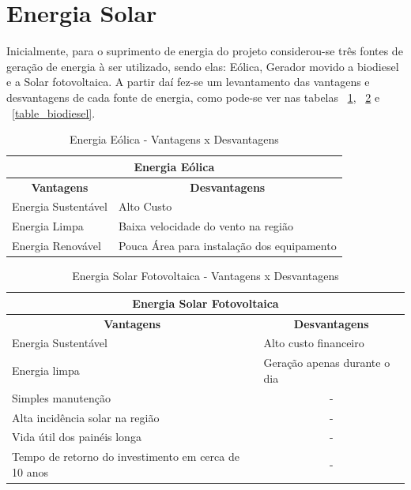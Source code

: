 \section{Energia Solar}
Inicialmente, para o suprimento de energia do projeto considerou-se três fontes de geração de energia à ser utilizado, sendo elas: Eólica, Gerador movido a biodiesel e a Solar fotovoltaica. A partir daí fez-se um levantamento das vantagens e desvantagens de cada fonte de energia, como pode-se ver nas tabelas ~\ref{table_eolica}, ~\ref{table_solar} e ~\ref{table_biodiesel}.

\begin{table}[h]
  \centering
  \caption{Energia Eólica - Vantagens x Desvantagens}
  \label{table_eolica}
  \begin{tabular}{|l|l|}
    \hline
    \multicolumn{2}{|c|}{\textbf{Energia Eólica}}                                         \\ \hline
    \multicolumn{1}{|c|}{\textbf{Vantagens}} & \multicolumn{1}{c|}{\textbf{Desvantagens}} \\ \hline
    Energia Sustentável                      & Alto Custo                                 \\ \hline
    Energia Limpa                            & Baixa velocidade do vento na região        \\ \hline
    Energia Renovável                        & Pouca Área para instalação dos equipamento \\ \hline
  \end{tabular}
\end{table}

\begin{table}[h]
  \centering
  \caption{Energia Solar Fotovoltaica - Vantagens x Desvantagens}
  \label{table_solar}
  \begin{tabular}{|l|c|}
    \hline
    \multicolumn{2}{|c|}{\textbf{Energia Solar Fotovoltaica}}                                                \\ \hline
    \multicolumn{1}{|c|}{\textbf{Vantagens}}             & \textbf{Desvantagens}                             \\ \hline
    Energia Sustentável                                  & \multicolumn{1}{l|}{Alto custo financeiro}        \\ \hline
    Energia limpa                                        & \multicolumn{1}{l|}{Geração apenas durante o dia} \\ \hline
    Simples manutenção                                   & -                                                 \\ \hline
    Alta incidência solar na região                      & -                                                 \\ \hline
    Vida útil dos painéis longa                          & -                                                 \\ \hline
    Tempo de retorno do investimento em cerca de 10 anos & -                                                 \\ \hline
  \end{tabular}
\end{table}


